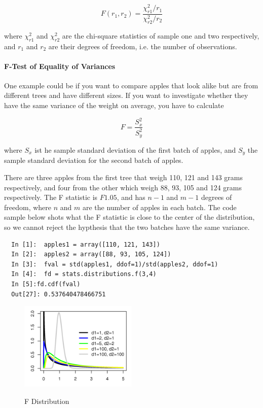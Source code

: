 \begin{equation}
    F(r_1, r_2) = \frac{\chi_{r1} ^2 /r_1}{\chi_{r2} ^2 /r_2}
\end{equation}

where $\chi_{r1}^2$ and $\chi_{r2}^2$ are the chi-square statistics of sample one and two respectively, and $r_1$ and $r_2$ are their degrees of freedom, i.e. the number of observations.

\paragraph{F-Test of Equality of Variances}
One example could be if you want to compare apples that look alike but are from different trees and have different sizes. If you want to investigate whether they have the same variance of the weight on average, you have to calculate

\begin{equation}
  F = \frac{S_x^2}{S_y^2}
\end{equation}

where $S_x$ ist he sample standard deviation of the first batch of apples, and $S_y$ the sample standard deviation for the second batch of apples.

There are three apples from the first tree that weigh 110, 121 and 143 grams respectively, and four from the other which weigh 88, 93, 105 and 124 grams respectively. The F statistic is $F 1.05$, and has $n-1$ and $m-1$ degrees of freedom, where $n$ and $m$ are the number of apples in each batch. The code sample below shots what the F statistic is close to the center of the distribution, so we cannot reject the hypthesis that the two batches have the same variance.

\begin{lstlisting}
  In [1]:  apples1 = array([110, 121, 143])
  In [2]:  apples2 = array([88, 93, 105, 124])
  In [3]:  fval = std(apples1, ddof=1)/std(apples2, ddof=1)
  In [4]:  fd = stats.distributions.f(3,4)
  In [5]:fd.cdf(fval)
  Out[27]: 0.537640478466751
\end{lstlisting}

\begin{figure}
  \centering
  \includegraphics[width=0.5\textwidth]{../Images/F_distributionPDF.png}\\
  \caption{F Distribution}
\end{figure}


